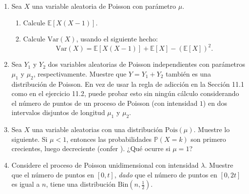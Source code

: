 \begin{enumerate}
	Note que el número total de autos que pasan en esos $20$ minutos es $230$.
	\begin{enumerate}
		\item ¿Qué elegirías para el parámetro de intensidad $\lambda$?\label{12.7a}
		\item Suponga que estima la probabilidad de que cero autos pasando en una ranura de tiempo de \SI{10}{\second} por $n_0$ dividido por el número total de ranuras de tiempo. ¿Eso está de acuerdo (razonablemente) con el valor que sigue desde su respuesta en~\ref{12.7a}? %
		\item  ¿Qué tomarías para la probabilidad que $10$ autos pasan en una ranura de tiempo de \SI{10}{\second}?
	\end{enumerate}
	\item Sea $X$ una variable aleatoria de Poisson con parámetro $\mu$.
	\begin{enumerate}
		\item Calcule $\mathds{E}\left[X\left(X-1\right)\right]$.
		\item Calcule $\mathrm{Var}\left(X\right)$, usando el siguiente hecho:
		\begin{equation*}
		\mathrm{Var}\left(X\right)=\mathds{E}\left[X\left(X-1\right)\right]+\mathds{E}\left[X\right]-{\left(\mathds{E}\left[X\right]\right)}^2.
		\end{equation*}
	\end{enumerate}
	\item Sea $Y_1$ y $Y_2$ dos variables aleatorias de Poisson independientes con parámetros $\mu_1$ y $\mu_2$, respectivamente. Muestre que $Y=Y_1+Y_2$ también es una distribución de Poisson. En vez de usar la regla de adicción en la Sección 11.1 como en el ejercicio 11.2, puede probar esto sin ningún cálculo considerando el número de puntos de un proceso de Poisson (con intensidad $1$) en dos intervalos disjuntos de longitud $\mu_1$ y $\mu_2$.
	\item Sea $X$ una variable aleatorias con una distribución $\mathrm{Pois}\left(\mu\right)$. Muestre lo siguiente. Si $\mu<1$, entonces las probabilidades $\mathds{P}\left(X=k\right)$ son primero crecientes, luego decreciente (confer ). ¿Qué ocurre si $\mu=1$? %
	\item Considere el proceso de Poisson unidimensional con intensidad $\lambda$. Muestre que el número de puntos en $\left[0,t\right]$, \emph{dado} que el número de puntos en $\left[0,2t\right]$ es igual a $n$, tiene una distribución $\mathrm{Bin}\left(n,\tfrac{1}{2}\right)$.


\end{enumerate}
